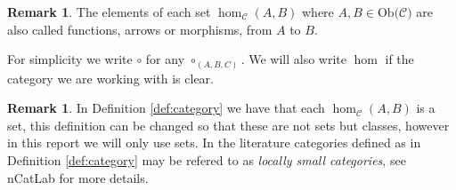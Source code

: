 \documentclass[11pt,a4paper]{article}
\theoremstyle{definition}
\newtheorem{remark}[thm]{Remark}
\newcommand\ho[3][]{\hom_{#1}(#2,#3)}
\newcommand\ob[1]{\mathrm{Ob(}#1\mathrm{)}}
\newcommand\cat[1]{\mathscr{#1}}
\numberwithin{equation}{section}
\begin{document}
\begin{remark}
\label{rmk:mapfuncarrow}
The elements of each set $\ho[\cat{C}]{A}{B}$ where $A,B\in\ob{\mathscr{C}}$  are also called functions, arrows or morphisms, from $A$ to $B$.

For simplicity we write $\circ$ for any $\circ_{(A,B,C)}$. We will also write $\hom$ if the category we are working with is clear.
\end{remark}
\begin{remark}
    In Definition \ref{def:category} we have that each $\ho[\cat{C}]{A}{B}$ is a set, this definition can be changed so that these are not sets but classes, however in this report we will only use sets. In the literature categories defined as in Definition \ref{def:category} may be refered to as \emph{locally small categories}, see nCatLab \cite{nLab} for more details.
\end{remark}
\end{document}
